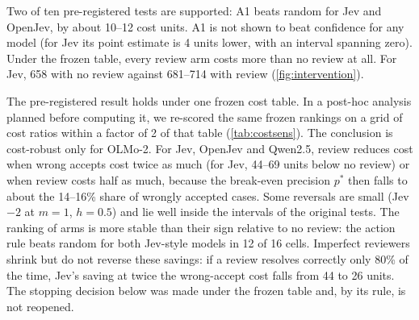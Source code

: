  Two of ten pre-registered tests are supported: A1 beats
random for Jev and OpenJev, by about 10--12 cost units. A1 is not shown
to beat confidence for any model (for Jev its point estimate is 4 units
lower, with an interval spanning zero). Under the frozen table, every review arm costs more than no review at all. For Jev,
658 with no review against 681--714 with review (\cref{fig:intervention}).

 The pre-registered result holds
under one frozen cost table. In a post-hoc analysis planned before
computing it, we re-scored the same frozen rankings on a grid of cost
ratios within a factor of 2 of that table (\cref{tab:costsens}). The
conclusion is cost-robust only for OLMo-2. For Jev, OpenJev and Qwen2.5,
review reduces cost when wrong accepts cost twice as much (for Jev, 44--69 units
below no review) or when review costs half as much, because the
break-even precision $p^{*}$ then falls to about the 14--16\% share of
wrongly accepted cases. Some reversals are small (Jev $-2$ at $m = 1$,
$h = 0.5$) and lie well inside the intervals of the original tests. The
ranking of arms is more stable than their sign relative to no review:
the action rule beats random for
both Jev-style models in 12 of 16 cells. Imperfect reviewers shrink but do
not reverse these savings: if a review resolves correctly only 80\% of
the time, Jev's saving at twice the wrong-accept cost falls from 44 to 26
units. The stopping decision below was
made under the frozen table and, by its rule, is not reopened.

\begin{coltable}
\centering
\caption{Exploratory cost sensitivity: best feasible arm minus no review
(negative, in bold: review reduces cost), with rankings frozen as pre-registered.
$m$ scales wrong-accept costs, $h$ is the human cost per escalation, and
$p^{*}$ is the break-even precision for reviewing an accepted case whose
target is \emph{escalate}. $^{\dagger}$The pre-registered table. Point
estimates only.}
\label{tab:costsens}
\small
\resizebox{\linewidth}{!}{}
\end{coltable}

